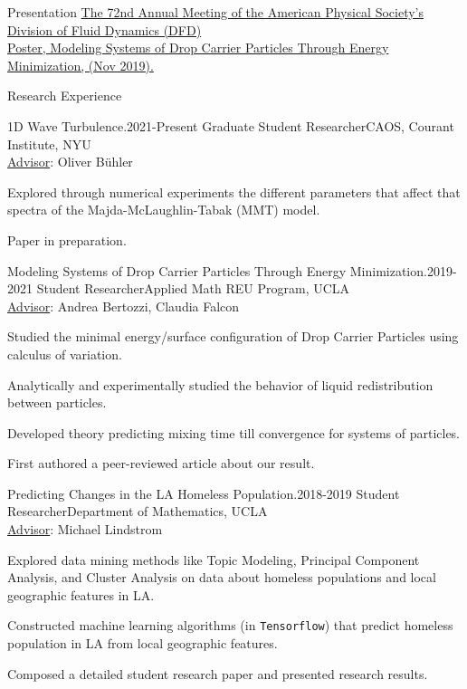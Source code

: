 \documentclass{resume} %
\begin{document}

\begin{rSection}{Presentation}
\href{https://meetings.aps.org/Meeting/DFD19/Session/NP05.36}{The 72nd Annual Meeting of the American Physical Society's Division of Fluid Dynamics (DFD)\\
Poster, Modeling Systems of Drop Carrier Particles Through Energy Minimization,  (Nov 2019).}
\end{rSection}


\begin{rSection}{Research Experience}

\begin{rSubsection}{1D Wave Turbulence.}{2021-Present}
{Graduate Student Researcher}{CAOS, Courant Institute, NYU\\\underline{Advisor}: Oliver B\"uhler}
\item Explored through numerical experiments the different parameters that affect that spectra of the Majda-McLaughlin-Tabak (MMT) model.
\item Paper in preparation.
\end{rSubsection}

\begin{rSubsection}{Modeling Systems of Drop Carrier Particles Through Energy
Minimization.}{2019-2021}
{Student Researcher}{Applied Math REU Program, UCLA\\\underline{Advisor}: Andrea Bertozzi, Claudia Falcon}

\item Studied the minimal energy/surface configuration of Drop Carrier Particles using calculus of variation.
\item Analytically and experimentally studied the behavior of liquid redistribution between particles.
\item Developed theory predicting mixing time till convergence for systems of particles.
\item First authored a peer-reviewed article about our result.
\end{rSubsection}

\begin{rSubsection}{Predicting Changes in the LA Homeless Population.}{2018-2019}
{Student Researcher}{Department of Mathematics, UCLA\\\underline{Advisor}: Michael Lindstrom}
\item Explored data mining methods like Topic Modeling, Principal Component Analysis, and Cluster Analysis on data about homeless populations and local geographic features in LA.
\item  Constructed machine learning algorithms (in \texttt{Tensorflow}) that predict homeless population in LA from local geographic features.
\item Composed a detailed student research paper and presented research results. 
\end{rSubsection}

\end{rSection}
\end{document}
